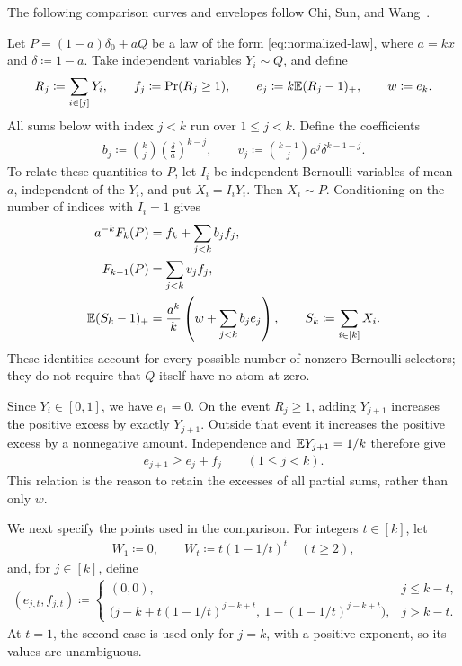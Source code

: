 The following comparison curves and envelopes follow Chi, Sun, and Wang~\cite[Section 3]{CSW2026}.

Let $P=(1-a)\delta_0+aQ$ be a law of the form \cref{eq:normalized-law}, where $a=kx$ and $\delta\coloneqq1-a$. Take independent variables $Y_i\sim Q$, and define
\begin{align}\label{eq:partial-sum-parameters}
 R_j\coloneqq\sum_{i\in[j]}Y_i,
 \qquad f_j\coloneqq\Pr(R_j\ge1),
 \qquad e_j\coloneqq k\mathbb E(R_j-1)_+,
 \qquad w\coloneqq e_k.
\end{align}
All sums below with index $j<k$ run over $1\le j<k$. Define the coefficients
\begin{align*}
 b_j\coloneqq\binom kj\left(\frac\delta a\right)^{k-j},
 \qquad v_j\coloneqq\binom{k-1}{j}a^j\delta^{k-1-j}.
\end{align*}
To relate these quantities to $P$, let $I_i$ be independent Bernoulli variables of mean $a$, independent of the $Y_i$, and put $X_i=I_iY_i$. Then $X_i\sim P$. Conditioning on the number of indices with $I_i=1$ gives
\begin{align}
 a^{-k}F_k(P)&=f_k+\sum_{j<k}b_jf_j,\label{eq:thinning-tail}\\
 F_{k-1}(P)&=\sum_{j<k}v_jf_j,\label{eq:thinning-short-tail}\\
 \mathbb E(S_k-1)_+&=\frac{a^k}{k}\left(w+\sum_{j<k}b_je_j\right),
 \qquad S_k\coloneqq\sum_{i\in[k]}X_i.\label{eq:thinning-excess}
\end{align}
These identities account for every possible number of nonzero Bernoulli selectors; they do not require that $Q$ itself have no atom at zero.

Since $Y_i\in[0,1]$, we have $e_1=0$. On the event $R_j\ge1$, adding $Y_{j+1}$ increases the positive excess by exactly $Y_{j+1}$. Outside that event it increases the positive excess by a nonnegative amount. Independence and $\mathbb E Y_{j+1}=1/k$ therefore give
\begin{align}\label{eq:excess-recursion}
 e_{j+1}\ge e_j+f_j\qquad(1\le j<k).
\end{align}
This relation is the reason to retain the excesses of all partial sums, rather than only $w$.

We next specify the points used in the comparison. For integers $t\in[k]$, let
\begin{align}\label{eq:comparison-nodes}
 W_1\coloneqq0,
 \qquad W_t\coloneqq t(1-1/t)^t\quad(t\ge2),
\end{align}
and, for $j\in[k]$, define
\begin{align}\label{eq:node-pairs}
 (e_{j,t},f_{j,t})\coloneqq
 \begin{cases}
 (0,0),&j\le k-t,\\
 \bigl(j-k+t(1-1/t)^{j-k+t},\ 1-(1-1/t)^{j-k+t}\bigr),&j>k-t.
 \end{cases}
\end{align}
At $t=1$, the second case is used only for $j=k$, with a positive exponent, so its values are unambiguous.

